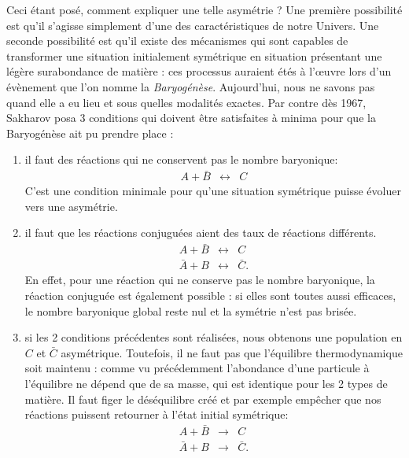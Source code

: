Ceci étant posé, comment expliquer une telle asymétrie ? Une première possibilité est qu'il s'agisse simplement d'une des caractéristiques de notre Univers. Une seconde possibilité est qu'il existe des mécanismes qui sont capables de transformer une situation initialement symétrique en situation présentant une légère surabondance de matière : ces processus auraient étés à l'œuvre lors d'un évènement que l'on nomme la \textit{Baryogénèse}. Aujourd'hui, nous ne savons pas quand elle a eu lieu et sous quelles modalités exactes. Par contre dès 1967, Sakharov posa 3 conditions qui doivent être satisfaites à minima pour que la Baryogénèse ait pu prendre place :
\begin{enumerate}
\item il faut des réactions qui ne conservent pas le nombre baryonique:
\begin{eqnarray}
A + \bar B &\leftrightarrow& C
\end{eqnarray}
C'est une condition minimale pour qu'une situation symétrique puisse évoluer vers une asymétrie.
\item il faut que les réactions conjuguées aient des taux de réactions différents.
\begin{eqnarray}
A + \bar B &\leftrightarrow& C\\
\bar A + B &\leftrightarrow& \bar C.
\end{eqnarray}
En effet, pour une réaction qui ne conserve pas le nombre baryonique, la réaction conjuguée est également possible : si elles sont toutes aussi efficaces, le nombre baryonique global reste nul et la symétrie n'est pas brisée.
\item si les 2 conditions précédentes sont réalisées, nous obtenons une population en $C$ et $\bar C$ asymétrique. Toutefois, il ne faut pas que l'équilibre thermodynamique soit maintenu : comme vu précédemment l'abondance d'une particule à l'équilibre ne dépend que de sa masse, qui est identique pour les 2 types de matière. Il faut figer le déséquilibre créé et par exemple empêcher que nos réactions puissent retourner à l'état initial symétrique:
\begin{eqnarray}
A + \bar B &\rightarrow& C\\
\bar A + B &\rightarrow& \bar C.
\end{eqnarray}
\end{enumerate}
